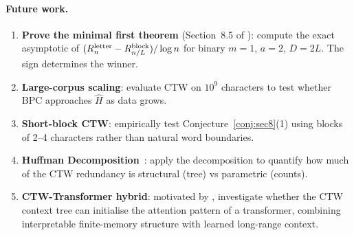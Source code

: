 \documentclass[11pt,a4paper]{article}
\newcommand{\bpcmin}{\widehat{H}}
\begin{document}
\paragraph{Future work.}
\begin{enumerate}[leftmargin=1.5em]
  \item \textbf{Prove the minimal first theorem} (Section~8.5 of \citealt{Willems2026}):
        compute the exact asymptotic of
        $(R_n^{\rm letter} - R_{n/L}^{\rm block})/\log n$
        for binary $m=1$, $a=2$, $D=2L$.
        The sign determines the winner.
  \item \textbf{Large-corpus scaling}:
        evaluate CTW on $10^9$ characters to test
        whether BPC approaches $\bpcmin$ as data grows.
  \item \textbf{Short-block CTW}:
        empirically test Conjecture~\ref{conj:sec8}(1)
        using blocks of 2--4 characters rather than natural word boundaries.
  \item \textbf{Huffman Decomposition}~\citep{Vol02}:
        apply the decomposition to quantify
        how much of the CTW redundancy is structural (tree) vs parametric (counts).
  \item \textbf{CTW-Transformer hybrid}:
        motivated by \citet{ZTD26}, investigate whether the
        CTW context tree can initialise the attention pattern of a transformer,
        combining interpretable finite-memory structure with learned long-range context.
\end{enumerate}
\end{document}
